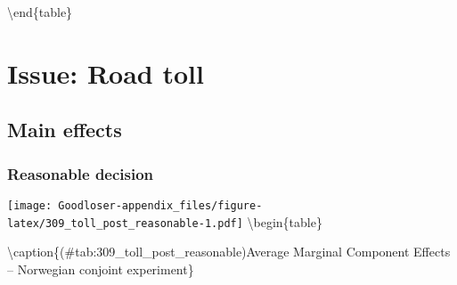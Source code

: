 \documentclass[
]{book}
\begin{document}
\textbackslash end\{table\}

\hypertarget{issue-road-toll}{%
\chapter{Issue: Road toll}\label{issue-road-toll}}

\hypertarget{main-effects-4}{%
\section{Main effects}\label{main-effects-4}}

\hypertarget{reasonable-decision-2}{%
\subsection{Reasonable decision}\label{reasonable-decision-2}}

\texttt{[image: Goodloser-appendix\_files/figure-latex/309\_toll\_post\_reasonable-1.pdf]} \textbackslash begin\{table\}

\textbackslash caption\{(\#tab:309\_toll\_post\_reasonable)Average Marginal Component Effects -- Norwegian conjoint experiment\}
\centering
\end{document}
